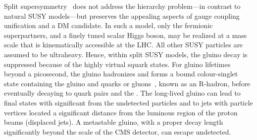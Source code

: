 Split supersymmetry~\cite{ArkaniHamed:2004fb, Giudice:2004tc} does not
address the hierarchy problem---in contrast to natural SUSY models---but
preserves the appealing aspects of gauge coupling unification and a
DM candidate. In such a model, only the fermionic superpartners, and a
finely tuned scalar Higgs boson, may be realized at a mass scale that
is kinematically accessible at the LHC. All other SUSY particles are
assumed to be ultraheavy. Hence, within split SUSY models, the gluino
decay is suppressed because of the highly virtual squark states. For
gluino lifetimes beyond a picosecond, the gluino
hadronizes and forms a bound colour-singlet state containing the
gluino and quarks or gluons~\cite{Fairbairn:2006gg}, known as an
R-hadron, before eventually decaying to quark pairs and the
\PSGczDo. The long-lived gluino can lead to final states with
significant \ptvecmiss from the undetected \PSGczDo particles and to jets
with particle vertices located a significant distance from the
luminous region of the proton beams (displaced jets). A metastable
gluino, with a proper decay length significantly beyond the scale of
the CMS detector, can escape undetected.


